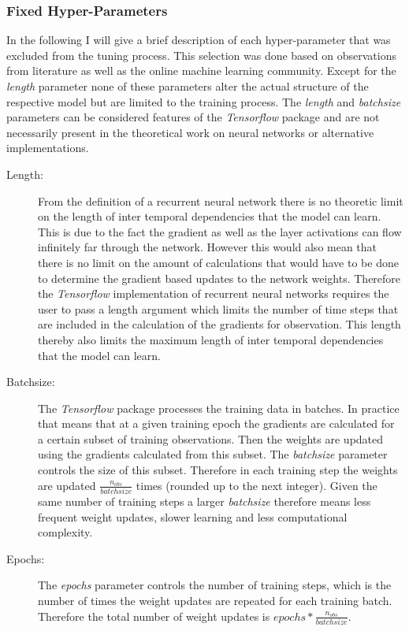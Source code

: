 \subsubsection{Fixed Hyper-Parameters}
In the following I will give a brief description of each hyper-parameter that was excluded from the tuning process. This selection was done based on observations from literature as well as the online machine learning community. Except for the \textit{length} parameter none of these parameters alter the actual structure of the respective model but are limited to the training process. The \textit{length} and \textit{batchsize} parameters can be considered features of the \textit{Tensorflow} package and are not necessarily present in the theoretical work on neural networks or alternative implementations.
\begin{description}
\item[Length:] From the definition of a recurrent neural network there is no theoretic limit on the length of inter temporal dependencies that the model can learn. This is due to the fact the gradient as well as the layer activations can flow infinitely far through the network. However this would also mean that there is no limit on the amount of calculations that would have to be done to determine the gradient based updates to the network weights. Therefore the \textit{Tensorflow} implementation of recurrent neural networks requires the user to pass a length argument which limits the number of time steps that are included in the calculation of the gradients for observation. This length thereby also limits the maximum length of inter temporal dependencies that the model can learn.

\item[Batchsize:] The \textit{Tensorflow} package processes the training data in batches. In practice that means that at a given training epoch the gradients are calculated for a certain subset of training observations. Then the weights are updated using the gradients calculated from this subset. The \textit{batchsize} parameter controls the size of this subset. Therefore in each training step the weights are updated $\frac{n_{obs}}{batchsize}$ times (rounded up to the next integer). Given the same number of training steps a larger \textit{batchsize} therefore means less frequent weight updates, slower learning and less computational complexity.

\item[Epochs:] The \textit{epochs} parameter controls the number of training steps, which is the number of times the weight updates are repeated for each training batch. Therefore the total number of weight updates is $epochs * \frac{n_{obs}}{batchsize}$. 


\end{description}
